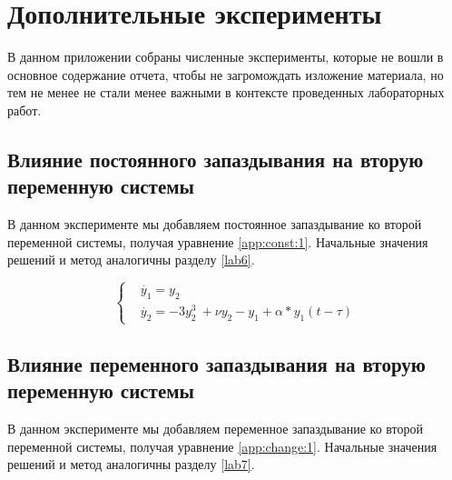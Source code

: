 \chapter{Дополнительные эксперименты}\label{app}

В данном приложении собраны численные эксперименты, которые
не вошли в основное содержание отчета, чтобы не загромождать
изложение материала, но тем не менее не стали менее важными
в контексте проведенных лабораторных работ.

\section{Влияние постоянного запаздывания на вторую
переменную системы}\label{app:const}

В данном эксперименте мы добавляем постоянное запаздывание
ко второй переменной системы, получая уравнение \eqref{app:const:1}.
Начальные значения решений и метод аналогичны разделу \ref{lab6}.

\begin{equation}\label{app:const:1}
    \begin{cases}
        &\dot{y_1} = y_2\\
        &\dot{y_2} = -3y_2^3\ + \nu y_2 - y_1  + \alpha * y_1(t-\tau)
    \end{cases}
\end{equation}

\clearpage
{}

\clearpage
\section{Влияние переменного запаздывания на вторую
переменную системы}\label{app:changeable}

В данном эксперименте мы добавляем переменное запаздывание
ко второй переменной системы, получая уравнение \eqref{app:change:1}.
Начальные значения решений и метод аналогичны разделу \ref{lab7}.

